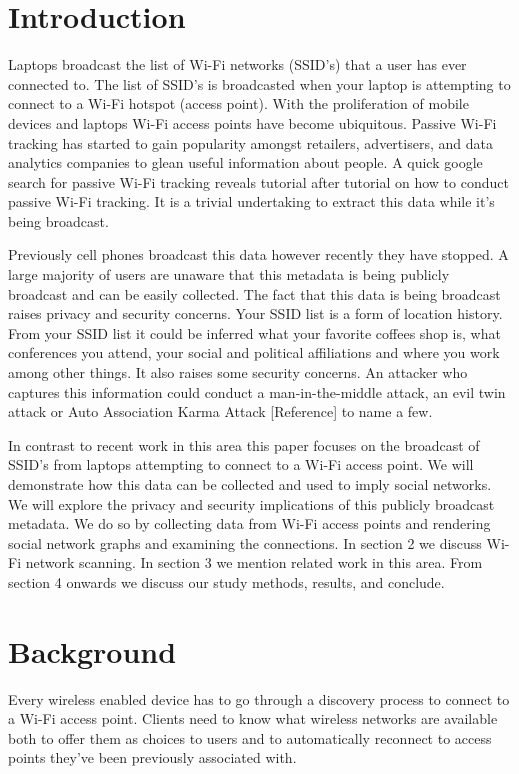 \documentclass[letterpaper,twocolumn,10pt]{article}
\begin{document}
\section{Introduction}
Laptops broadcast the list of Wi-Fi networks (SSID's) that a user has ever connected to. The list of SSID's is broadcasted when your laptop is attempting to connect to a Wi-Fi hotspot (access point). With the proliferation of mobile devices and laptops Wi-Fi access points have become ubiquitous. Passive Wi-Fi tracking has started to gain popularity amongst retailers, advertisers, and data analytics companies to glean useful information about people. A quick google search for passive Wi-Fi tracking reveals tutorial after tutorial on how to conduct passive Wi-Fi tracking. It is a trivial undertaking to extract this data while it's being broadcast. 

Previously cell phones broadcast this data however recently they have stopped. A large majority of users are unaware that this metadata is being publicly broadcast and can be easily collected. The fact that this data is being broadcast raises privacy and security concerns. Your SSID list is a form of location history. From your SSID list it could be inferred what your favorite coffees shop is, what conferences you attend, your social and political affiliations and where you work among other things. It also raises some security concerns. An attacker who captures this information could conduct a man-in-the-middle attack, an evil twin attack or Auto Association Karma Attack [Reference] to name a few. 

In contrast to recent work in this area this paper focuses on the broadcast of SSID's from laptops attempting to connect to a Wi-Fi access point. We will demonstrate how this data can be collected and used to imply social networks. We will explore the privacy and security implications of this publicly broadcast metadata. We do so by collecting data from Wi-Fi access points and rendering social network graphs and examining the connections. In section 2 we discuss Wi-Fi network scanning. In section 3 we mention related work in this area. From section 4 onwards we discuss our study methods, results, and conclude.



\section{Background}
Every wireless enabled device has to go through a discovery process to connect to a Wi-Fi access point. Clients need to know what wireless networks are available both to offer them as choices to users and to automatically reconnect to access points they've been previously associated with.
\end{document}

